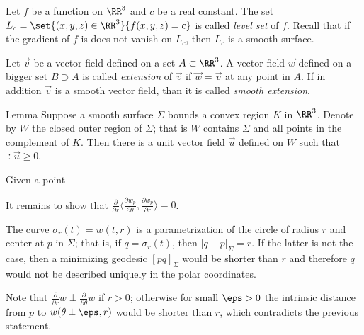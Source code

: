 Let $f$ be a function on $\RR^3$ and $c$ be a real constant.
The set $L_c=\set{(x,y,z)\in\RR^3}{f(x,y,z)=c}$ is called \emph{level set} of $f$.
Recall that if the gradient of $f$ is does not vanish on $L_c$, then $L_c$ is a smooth surface.

Let $\vec v$ be a vector field defined on a set $A\subset \RR^3$.
A vector field $\vec w$ defined on a bigger set $B\supset A$
is called \emph{extension} of $\vec v$ if $\vec w=\vec v$ at any point in $A$.
If in addition $\vec v$ is a smooth vector field, than it is called \emph{smooth extension}. 


\begin{thm}{Lemma}
Suppose a smooth surface $\Sigma$ bounds a convex region $K$ in $\RR^3$.
Denote by $W$ the closed outer region of $\Sigma$; that is $W$ contains $\Sigma$ and all points in the complement of $K$.  
Then there is a unit vector field $\vec u$ defined on $W$ such that 
$\div \vec u\ge 0$.
\end{thm}

Given a point 
\qeds






















It remains to show that $\tfrac{\partial}{\partial r}\langle\tfrac{\partial w_p}{\partial\theta},\tfrac{\partial w_p}{\partial r}\rangle=0$.

The curve $\sigma_r(t)=w(t,r)$ is a parametrization of the circle of radius $r$ and center at $p$ in $\Sigma$; that is, if $q=\sigma_r(t)$, then $|q-p|_\Sigma=r$.
If the latter is not the case, then a minimizing geodesic $[pq]_\Sigma$ would be shorter than $r$ and therefore $q$ would not be described uniquely in the polar coordinates. 

Note that $\tfrac{\partial}{\partial r}w\perp \tfrac{\partial}{\partial \theta}w$ if $r>0$;
otherwise for small $\eps>0$ the intrinsic distance from $p$ to $w(\theta\pm \eps,r)$ would be shorter than $r$, which contradicts the previous statement.

